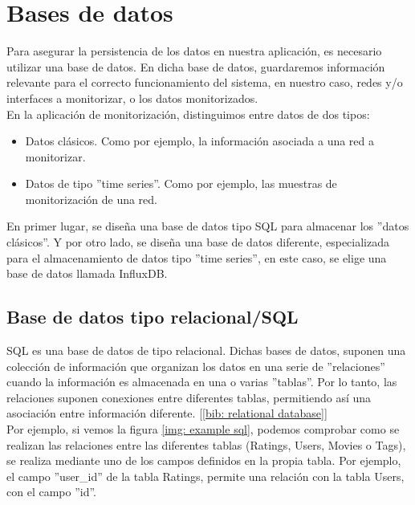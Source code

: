 \documentclass[a4paper, oneside, 12pt]{book}
\begin{document}
	
	\pagebreak
	
	\section{Bases de datos}
	
	\noindent Para asegurar la persistencia de los datos en nuestra aplicación, es necesario utilizar una base de datos. En dicha base de datos, guardaremos información relevante para el correcto funcionamiento del sistema, en nuestro caso, redes y/o interfaces a monitorizar, o los datos monitorizados. \\
	
	\noindent En la aplicación de monitorización, distinguimos entre datos de dos tipos:
	
	\begin{itemize}
		\item Datos clásicos. Como por ejemplo, la información asociada a una red a monitorizar.
		\item Datos de tipo ''time series''. Como por ejemplo, las muestras de monitorización de una red.
	\end{itemize}

	\noindent En primer lugar, se diseña una base de datos tipo SQL para almacenar los ''datos clásicos''. Y por otro lado, se diseña una base de datos diferente, especializada para el almacenamiento de datos tipo ''time series'', en este caso, se elige una base de datos llamada InfluxDB.
	
	\subsection{Base de datos tipo relacional/SQL}
	
	\noindent SQL es una base de datos de tipo relacional. Dichas bases de datos, suponen una colección de información que organizan los datos en una serie de ''relaciones'' cuando la información es almacenada en una o varias ''tablas''. Por lo tanto, las relaciones suponen conexiones entre diferentes tablas, permitiendo así una asociación entre información diferente. [\ref{bib: relational database}] \\
	
	\noindent Por ejemplo, si vemos la figura \ref{img: example sql}, podemos comprobar como se realizan las relaciones entre las diferentes tablas (Ratings, Users, Movies o Tags), se realiza mediante uno de los campos definidos en la propia tabla. Por ejemplo, el campo ''user\_id'' de la tabla Ratings, permite una relación con la tabla Users, con el campo ''id''.
	
\end{document}
